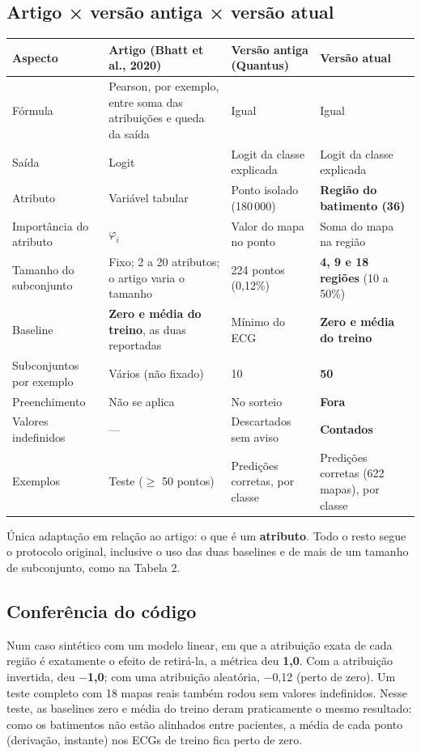 \documentclass[11pt,a4paper]{article}
\begin{document}
\subsection{Artigo × versão antiga × versão atual}
\begin{center}\small
\begin{tabularx}{\linewidth}{lXXX}
\toprule
\textbf{Aspecto} & \textbf{Artigo (Bhatt et al., 2020)} & \textbf{Versão antiga (Quantus)} & \textbf{Versão atual} \\
\midrule
Fórmula & Pearson, por exemplo, entre soma das atribuições e queda da saída & Igual & Igual \\
Saída & Logit & Logit da classe explicada & Logit da classe explicada \\
Atributo & Variável tabular & Ponto isolado (180\,000) & \textbf{Região do batimento (36)} \\
Importância do atributo & $\varphi_i$ & Valor do mapa no ponto & Soma do mapa na região \\
Tamanho do subconjunto & Fixo; 2 a 20 atributos; o artigo varia o tamanho & 224 pontos (0,12\%) & \textbf{4, 9 e 18 regiões} (10 a 50\%) \\
Baseline & \textbf{Zero e média do treino}, as duas reportadas & Mínimo do ECG & \textbf{Zero e média do treino} \\
Subconjuntos por exemplo & Vários (não fixado) & 10 & \textbf{50} \\
Preenchimento & Não se aplica & No sorteio & \textbf{Fora} \\
Valores indefinidos & — & Descartados sem aviso & \textbf{Contados} \\
Exemplos & Teste ($\geq$ 50 pontos) & Predições corretas, por classe & Predições corretas (622 mapas), por classe \\
\bottomrule
\end{tabularx}
\end{center}
Única adaptação em relação ao artigo: o que é um \textbf{atributo}. Todo o resto segue o protocolo original, inclusive o uso das duas baselines e de mais de um tamanho de subconjunto, como na Tabela 2.

\subsection{Conferência do código}
Num caso sintético com um modelo linear, em que a atribuição exata de cada região é exatamente o efeito de retirá-la, a métrica deu \textbf{1,0}. Com a atribuição invertida, deu \textbf{$-$1,0}; com uma atribuição aleatória, $-$0,12 (perto de zero). Um teste completo com 18 mapas reais também rodou sem valores indefinidos. Nesse teste, as baselines zero e média do treino deram praticamente o mesmo resultado: como os batimentos não estão alinhados entre pacientes, a média de cada ponto (derivação, instante) nos ECGs de treino fica perto de zero.
\end{document}
